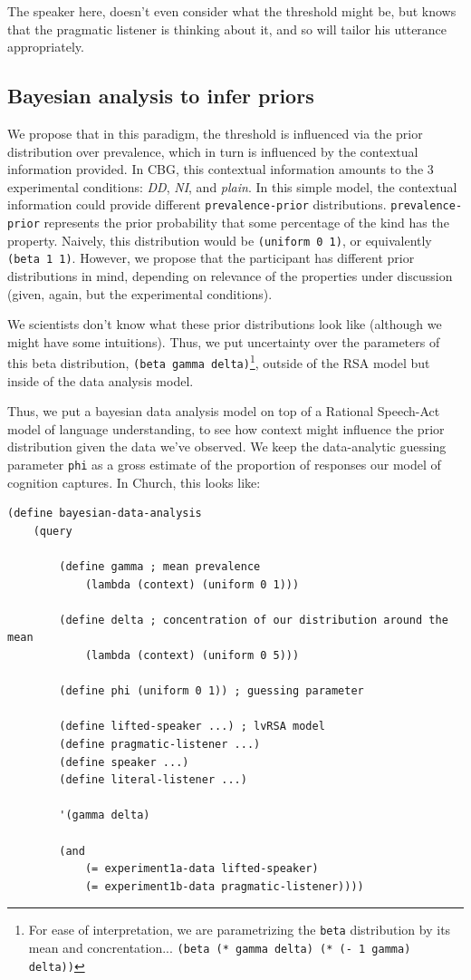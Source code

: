 \documentclass[10pt,letterpaper]{article}
\begin{document}
The speaker here, doesn't even consider what the threshold might be, but knows that the pragmatic listener is thinking about it, and so will tailor his utterance appropriately.


\subsection{Bayesian analysis to infer priors}

We propose that in this paradigm, the threshold is influenced via the prior distribution over prevalence, which in turn is influenced by the contextual information provided. In CBG, this contextual information amounts to the 3 experimental conditions: \emph{DD}, \emph{NI}, and \emph{plain}. In this simple model, the contextual information could provide different \lstinline{prevalence-prior} distributions. \lstinline{prevalence-prior} represents the  prior probability that some percentage of the kind has the property. Naively, this distribution would be \lstinline{(uniform 0 1)}, or equivalently \lstinline{(beta 1 1)}. However, we propose that the participant has different prior distributions in mind, depending on relevance of the properties under discussion (given, again, but the experimental conditions).

We scientists don't know what these prior distributions look like (although we might have some intuitions). Thus, we put uncertainty over the parameters of this beta distribution, \lstinline{(beta gamma delta)}\footnote{For ease of interpretation, we are parametrizing the \lstinline{beta} distribution by its mean and concrentation... \lstinline{(beta (* gamma delta) (* (- 1 gamma) delta))}}, outside of the RSA model but inside of the data analysis model. 

Thus, we put a bayesian data analysis model on top of a Rational Speech-Act model of language understanding, to see how context might influence the prior distribution given the data we've observed. We keep the data-analytic guessing parameter \lstinline{phi} as a gross estimate of the proportion of responses our model of cognition captures. In Church, this looks like:

\begin{lstlisting}
(define bayesian-data-analysis
	(query
	
		(define gamma ; mean prevalence
			(lambda (context) (uniform 0 1)))
			
		(define delta ; concentration of our distribution around the mean
			(lambda (context) (uniform 0 5)))
			
		(define phi (uniform 0 1)) ; guessing parameter
	
		(define lifted-speaker ...) ; lvRSA model
		(define pragmatic-listener ...)
		(define speaker ...)
		(define literal-listener ...)
				
		'(gamma delta)
				
		(and 
			(= experiment1a-data lifted-speaker)
			(= experiment1b-data pragmatic-listener))))
\end{lstlisting}
\end{document}
